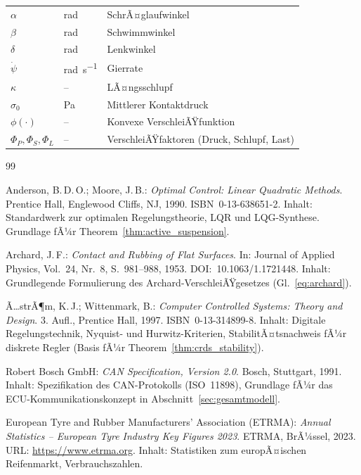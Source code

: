 ﻿\documentclass[12pt,a4paper]{article}
\theoremstyle{definition}
\theoremstyle{remark}
\begin{document}
\begin{longtable}{lll}
$\alpha$ & \si{\radian} & SchrÃ¤glaufwinkel\\
$\beta$ & \si{\radian} & Schwimmwinkel\\
$\delta$ & \si{\radian} & Lenkwinkel\\
$\dot\psi$ & \si{\radian\per\second} & Gierrate\\
$\kappa$ & -- & LÃ¤ngsschlupf\\
$\sigma_0$ & \si{\pascal} & Mittlerer Kontaktdruck\\
$\phi(\cdot)$ & -- & Konvexe VerschleiÃŸfunktion\\
$\Phi_P, \Phi_S, \Phi_L$ & -- & VerschleiÃŸfaktoren (Druck, Schlupf, Last)\\
\bottomrule
\end{longtable}

\begin{thebibliography}{99}

Anderson, B.\,D.\,O.; Moore, J.\,B.: \textit{Optimal Control: Linear Quadratic Methods}.
Prentice Hall, Englewood Cliffs, NJ, 1990.
ISBN~0-13-638651-2.
Inhalt: Standardwerk zur optimalen Regelungstheorie, LQR und LQG-Synthese.
Grundlage fÃ¼r Theorem~\ref{thm:active_suspension}.

Archard, J.\,F.: \textit{Contact and Rubbing of Flat Surfaces}.
In: Journal of Applied Physics, Vol.~24, Nr.~8, S.~981--988, 1953.
DOI:~10.1063/1.1721448.
Inhalt: Grundlegende Formulierung des Archard-VerschleiÃŸgesetzes (Gl.~\ref{eq:archard}).

Ã…strÃ¶m, K.\,J.; Wittenmark, B.: \textit{Computer Controlled Systems: Theory and Design}.
3. Aufl., Prentice Hall, 1997.
ISBN~0-13-314899-8.
Inhalt: Digitale Regelungstechnik, Nyquist- und Hurwitz-Kriterien, StabilitÃ¤tsnachweis
fÃ¼r diskrete Regler (Basis fÃ¼r Theorem~\ref{thm:crds_stability}).

Robert Bosch GmbH: \textit{CAN Specification, Version 2.0}.
Bosch, Stuttgart, 1991.
Inhalt: Spezifikation des CAN-Protokolls (ISO~11898), Grundlage fÃ¼r das
ECU-Kommunikationskonzept in Abschnitt~\ref{sec:gesamtmodell}.

European Tyre and Rubber Manufacturers' Association (ETRMA):
\textit{Annual Statistics -- European Tyre Industry Key Figures 2023}.
ETRMA, BrÃ¼ssel, 2023. URL: \url{https://www.etrma.org}.
Inhalt: Statistiken zum europÃ¤ischen Reifenmarkt, Verbrauchszahlen.


\end{thebibliography}
\end{document}
